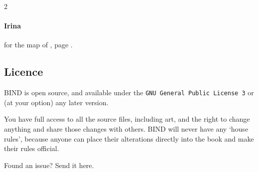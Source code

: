\begin{multicols}{2}
\paragraph{Irina}
for the map of , page \pageref{Irina/greylands}.

\subsection*{Licence}

BIND is open source, and available under the {\tt GNU General Public License 3} or (at your option) any later version.

You have full access to all the source files, including art, and the right to change anything and share those changes with others.
BIND will never have any `house rules', because anyone can place their alterations directly into the book and make their rules official.

\begin{center}
  
  Found an issue?
  Send it here.
\end{center}

\end{multicols}

\pagebreak
